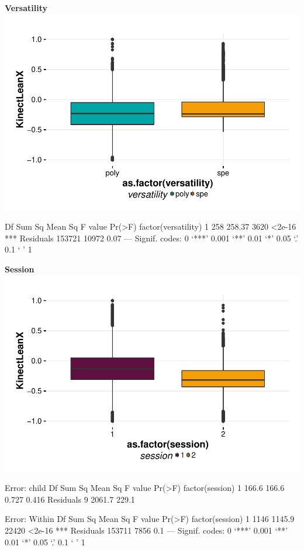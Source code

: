 \documentclass{article}
\begin{document}
\textbf{Versatility}
\includegraphics{features-plot_leanx_gender_quiz}

\begin{Schunk}
\begin{Soutput}
                        Df Sum Sq Mean Sq F value Pr(>F)    
factor(versatility)      1    258  258.37    3620 <2e-16 ***
Residuals           153721  10972    0.07                   
---
Signif. codes:  0 ‘***’ 0.001 ‘**’ 0.01 ‘*’ 0.05 ‘.’ 0.1 ‘ ’ 1
\end{Soutput}
\end{Schunk}


\textbf{Session}
\includegraphics{features-plot_leanx_session_quiz}

\begin{Schunk}
\begin{Soutput}
Error: child
                Df Sum Sq Mean Sq F value Pr(>F)
factor(session)  1  166.6   166.6   0.727  0.416
Residuals        9 2061.7   229.1               

Error: Within
                    Df Sum Sq Mean Sq F value Pr(>F)    
factor(session)      1   1146  1145.9   22420 <2e-16 ***
Residuals       153711   7856     0.1                   
---
Signif. codes:  0 ‘***’ 0.001 ‘**’ 0.01 ‘*’ 0.05 ‘.’ 0.1 ‘ ’ 1
\end{Soutput}
\end{Schunk}
\end{document}
